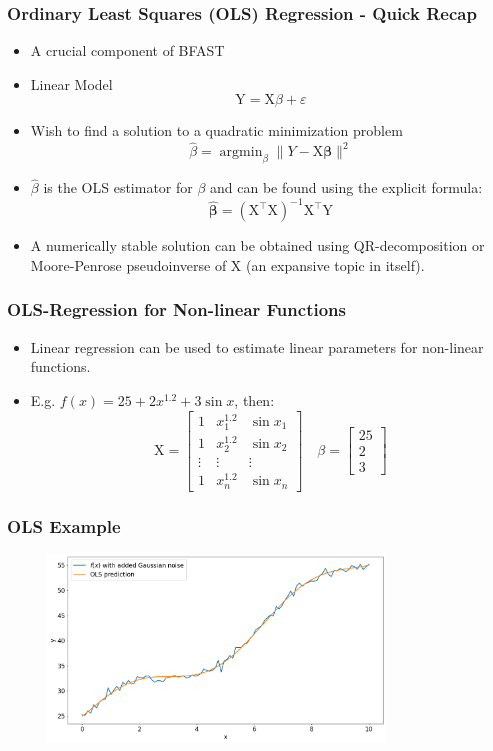\documentclass[presentation.tex]{subfiles}
\begin{document}
\begin{frame}
  \frametitle{Ordinary Least Squares (OLS) Regression - Quick Recap}
  \begin{itemize}
    \item A crucial component of BFAST
    \item Linear Model
      \[
      \mathrm{Y} = \mathrm{X}\beta + \varepsilon
      \]
    \item Wish to find a solution to a quadratic minimization problem
      \[
      \hat{\beta} = \operatorname{argmin}_{\beta} \|Y-\mathrm{X} \boldsymbol{\beta}\|^{2}
      \]
    \item $\hat{\beta}$ is the OLS estimator for $\beta$ and can be found using the explicit formula:
      \[
      \hat{\boldsymbol{\beta}}=\left(\mathrm{X}^{\top} \mathrm{X}\right)^{-1}\mathrm{X}^{\top} \mathrm{Y}
      \]
    \item A numerically stable solution can be obtained using QR-decomposition or Moore-Penrose
      pseudoinverse of $\mathrm{X}$ (an expansive topic in itself).
  \end{itemize}
\end{frame}

\begin{frame}
\frametitle{OLS-Regression for Non-linear Functions}
\begin{itemize}
\item Linear regression can be used to estimate linear parameters for
  non-linear functions.
\item E.g. $f(x) = 25 + 2x^{1.2} + 3 \sin{x}$, then:
  \[
  \mathrm{X} = 
  \begin{bmatrix}
    1 & x_1^{1.2} & \sin{x_1}\\
    1 & x_2^{1.2} & \sin{x_2}\\
    \vdots & \vdots & \vdots \\
    1 & x_n^{1.2} & \sin{x_n}
  \end{bmatrix}
  \quad
  \beta =
  \begin{bmatrix}
    25 \\
    2 \\
    3
  \end{bmatrix}
  \]
\end{itemize}
\end{frame}


\begin{frame}
  \frametitle{OLS Example}
  \begin{figure}[H]
    \centering
    \includegraphics[width=0.8\textwidth]{imgs/ols1.png}
  \end{figure}
\end{frame}
\end{document}
